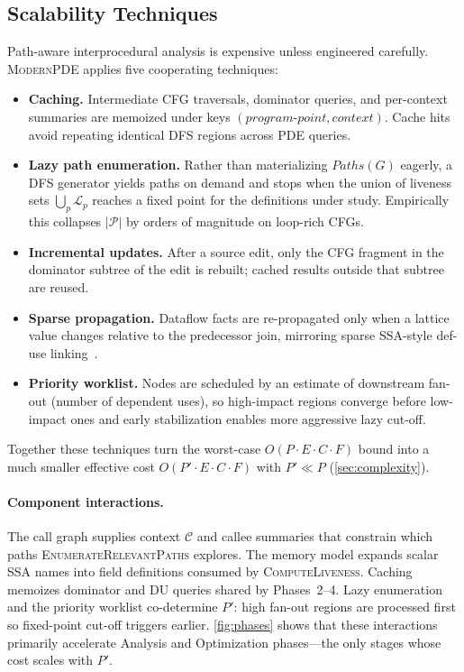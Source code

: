 \documentclass[acmsmall,screen,review,anonymous]{acmart}
\begin{document}
\subsection{Scalability Techniques}
Path-aware interprocedural analysis is expensive unless engineered carefully. \textsc{ModernPDE} applies five cooperating techniques:
\begin{itemize}[leftmargin=*,itemsep=1pt]
\item \textbf{Caching.} Intermediate CFG traversals, dominator queries, and per-context summaries are memoized under keys $(\mathit{program\text{-}point},\mathit{context})$. Cache hits avoid repeating identical DFS regions across PDE queries.
\item \textbf{Lazy path enumeration.} Rather than materializing $\mathit{Paths}(G)$ eagerly, a DFS generator yields paths on demand and stops when the union of liveness sets $\bigcup_p\mathcal{L}_p$ reaches a fixed point for the definitions under study. Empirically this collapses $|\mathcal{P}|$ by orders of magnitude on loop-rich CFGs.
\item \textbf{Incremental updates.} After a source edit, only the CFG fragment in the dominator subtree of the edit is rebuilt; cached results outside that subtree are reused.
\item \textbf{Sparse propagation.} Dataflow facts are re-propagated only when a lattice value changes relative to the predecessor join, mirroring sparse SSA-style def-use linking~\cite{cytron1991efficient}.
\item \textbf{Priority worklist.} Nodes are scheduled by an estimate of downstream fan-out (number of dependent uses), so high-impact regions converge before low-impact ones and early stabilization enables more aggressive lazy cut-off.
\end{itemize}
Together these techniques turn the worst-case $O(P\cdot E\cdot C\cdot F)$ bound into a much smaller effective cost $O(P'\cdot E\cdot C\cdot F)$ with $P'\ll P$ (\autoref{sec:complexity}).

\paragraph{Component interactions.}
The call graph supplies context $\mathcal{C}$ and callee summaries that constrain which paths \textsc{EnumerateRelevantPaths} explores. The memory model expands scalar SSA names into field definitions consumed by \textsc{ComputeLiveness}. Caching memoizes dominator and DU queries shared by Phases~2--4. Lazy enumeration and the priority worklist co-determine $P'$: high fan-out regions are processed first so fixed-point cut-off triggers earlier. \autoref{fig:phases} shows that these interactions primarily accelerate Analysis and Optimization phases---the only stages whose cost scales with $P'$.
\end{document}
